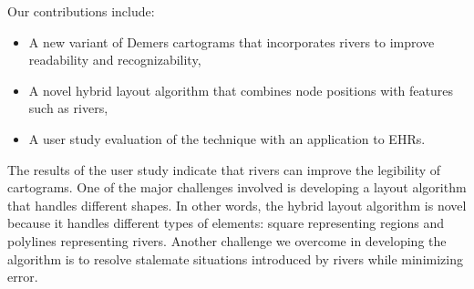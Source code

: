 Our contributions include:

\begin{itemize}
    \item A new variant of Demers cartograms that incorporates rivers to improve readability and recognizability,
    \item A novel hybrid layout algorithm that combines node positions with features such as rivers,
    \item A user study evaluation of the technique with an application to EHRs.
\end{itemize}

The results of the user study indicate that rivers can improve the legibility of cartograms. One of the major challenges involved is developing a layout algorithm that handles different shapes. In other words, the hybrid layout algorithm is novel because it handles different types of elements: square representing regions and polylines representing rivers. Another challenge we overcome in developing the algorithm is to resolve stalemate situations introduced by rivers while minimizing error.